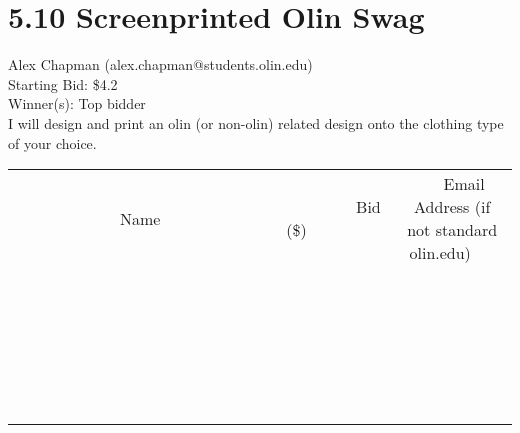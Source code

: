 \documentclass[11pt]{article}
\begin{document}
\section*{5.10 Screenprinted Olin Swag}
Alex Chapman (alex.chapman@students.olin.edu) \\
Starting Bid: \$4.2 \\
Winner(s): 
Top bidder \\
I will design and print an olin (or non-olin) related design onto the clothing type of your choice. \\[6ex]
\begin{tabular}{c c c}
~~~~~~~~~~~~~Name~~~~~~~~~~~~~ & ~~~~~~~~~Bid (\$)~~~~~~~~~ & ~~~Email Address (if not standard olin.edu)~~~ \\
 & & \\
\hline
 & & \\
\hline
 & & \\
\hline
 & & \\
\hline
 & & \\
\hline
 & & \\
\hline
 & & \\
\hline
 & & \\
\hline
 & & \\
\hline
 & & \\
\hline
 & & \\
\hline
 & & \\
\hline
 & & \\
\hline
 & & \\
\hline
 & & \\
\hline
 & & \\
\hline
 & & \\
\hline
 & & \\
\hline
 & & \\
\hline
 & & \\
\hline
 & & \\
\hline
 & & \\
\hline
 & & \\
\hline
 & & \\
\hline
 & & \\
\hline
 & & \\
\hline
\end{tabular}
\clearpage
\end{document}
